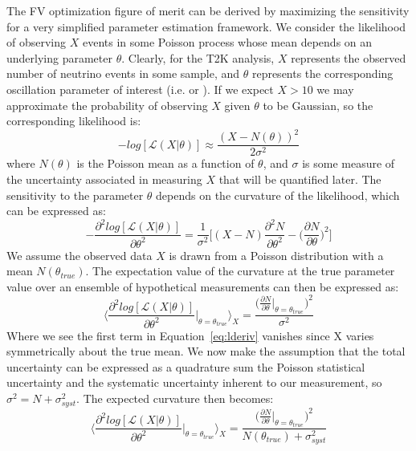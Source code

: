 The FV optimization figure of merit can be derived by maximizing the
sensitivity for a very simplified parameter estimation framework. We
consider the likelihood of observing $X$ events in some Poisson process whose
mean depends on an underlying parameter $\theta$. Clearly, for the T2K
analysis, $X$ represents the observed number of neutrino events in some sample,
and $\theta$ represents the corresponding oscillation parameter of interest
(i.e. \thdis or \dcp).  If we expect $X>10$ we may approximate the probability
of observing $X$ given $\theta$ to be Gaussian, so the corresponding likelihood
is:
%
\begin{equation}
  -log[\mathcal{L}(X|\theta)] \approx \frac{(X - N(\theta))^{2}}{2\sigma^{2}}
\end{equation}
%
where $N(\theta)$ is the Poisson mean as a function of $\theta$, and $\sigma$
is some measure of the uncertainty associated in measuring $X$ that will be
quantified later. The sensitivity to the parameter  $\theta$ depends on the
curvature of the likelihood, which can be expressed as:
%
\begin{equation}
\label{eq:lderiv}
  -\frac{\partial^{2}  log[\mathcal{L}(X|\theta)]}{\partial \theta^{2}} =
  \frac{1}{\sigma^{2}}\bigg[(X - N)\frac{\partial^{2} N}{\partial \theta^{2}} - \bigg(\frac{\partial N}{\partial \theta}\bigg)^{2} \bigg]
\end{equation}
%
We assume the observed data $X$ is drawn from a Poisson distribution with a
mean $N(\theta_{true})$.  The expectation value of the curvature at the true
parameter value over an ensemble of hypothetical measurements can then be
expressed as:
%
\begin{equation}
  \bigg\langle \frac{\partial^{2} log[\mathcal{L}(X|\theta)]}{\partial \theta^{2}} \Big|_{\theta = \theta_{true}}  \bigg\rangle_{X} = 
  \frac{\big( \frac{\partial N}{\partial \theta}|_{\theta = \theta_{true}}\big)^{2}}{\sigma^{2}}
\end{equation}
%
Where we see the first term in Equation~\ref{eq:lderiv} vanishes since X varies
symmetrically about the true mean.  We now make the assumption that the total
uncertainty can be expressed as a quadrature sum the Poisson statistical
uncertainty and the systematic uncertainty inherent to our measurement, so
$\sigma^{2} = N + \sigma^{2}_{syst}$.  The expected curvature then becomes:
%
\begin{equation}
   \bigg\langle \frac{\partial^{2} log[\mathcal{L}(X|\theta)]}{\partial \theta^{2}} \Big|_{\theta = \theta_{true}}  \bigg\rangle_{X} = 
   \frac{\big( \frac{\partial N}{\partial \theta}|_{\theta = \theta_{true}}\big)^{2}}{N(\theta_{true}) + \sigma_{syst}^{2}}
\end{equation}
